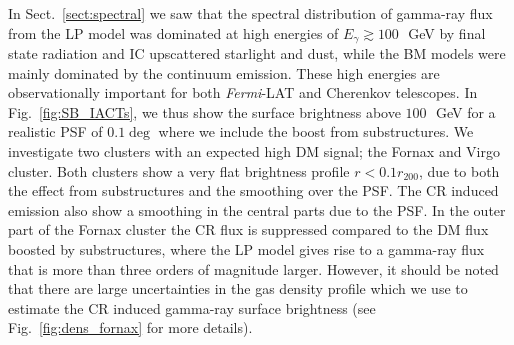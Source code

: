 \documentclass[10pt,aps,pra,reprint,amsmath,amsfonts,amssymb,showpacs,nofootinbib,floatfix]{revtex4-1}
\newcommand{\Fermi}{{\em Fermi}\xspace}
\newcommand{\rvir}{r_{200}}
\begin{document}
In Sect.~\ref{sect:spectral} we saw that the spectral distribution of
gamma-ray flux from the LP model was dominated at high energies of
$E_\gamma\gtrsim 100\,$~GeV by final state radiation and IC upscattered
starlight and dust, while the BM models were mainly dominated by the
continuum emission. These high energies are observationally important
for both \Fermi-LAT and Cherenkov telescopes. In
Fig.~\ref{fig:SB_IACTs}, we thus show the surface brightness above
$100\,$~GeV for a realistic PSF of $0.1\deg$ where we include the
boost from substructures. We investigate two clusters with an expected
high DM signal; the Fornax and Virgo cluster. Both clusters show a
very flat brightness profile $r<0.1\rvir$, due to both the effect from
substructures and the smoothing over the PSF. The CR induced emission
also show a smoothing in the central parts due to the PSF. In the
outer part of the Fornax cluster the CR flux is suppressed compared to
the DM flux boosted by substructures, where the LP model gives rise to
a gamma-ray flux that is more than three orders of magnitude
larger. However, it should be noted that there are large uncertainties
in the gas density profile which we use to estimate the CR induced
gamma-ray surface brightness (see Fig.~\ref{fig:dens_fornax} for more
details).
\end{document}
